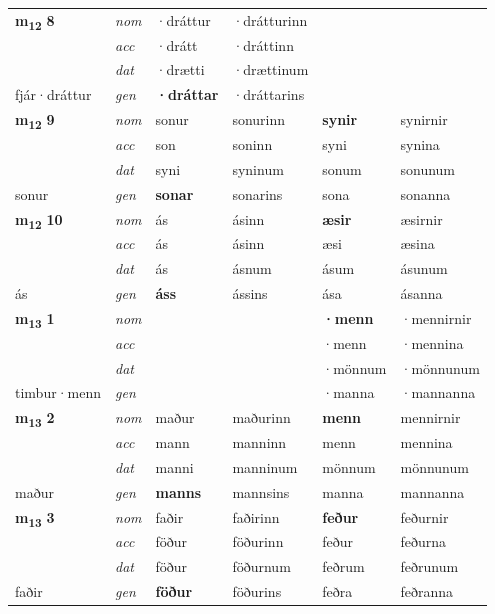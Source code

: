 \begin{longtable}[l]{X>{\footnotesize\itshape}XXXXX}
\multirow{3}{*}{{{\textbf{m{\textsubscript{12}}} \Large{\textbf{8}}}}} & nom & ·dráttur & ·drátturinn & \textbf{} &  \\*
 & acc & ·drátt & ·dráttinn &  &  \\*
 & dat & ·drætti & ·drættinum &  &  \\*
 {\footnotesize{fjár\allowbreak ·dráttur}} & gen & \textbf{·dráttar} & ·dráttarins &  &  \\
\cmidrule{1-6}

\multirow{3}{*}{{{\textbf{m{\textsubscript{12}}} \Large{\textbf{9}}}}} & nom & sonur & sonurinn & \textbf{synir} & synirnir \\*
 & acc & son & soninn & syni & synina \\*
 & dat & syni & syninum & sonum & sonunum \\*
 {\footnotesize{sonur}} & gen & \textbf{sonar} & sonarins & sona & sonanna \\
\cmidrule{1-6}

\multirow{3}{*}{{{\textbf{m{\textsubscript{12}}} \Large{\textbf{10}}}}} & nom & ás & ásinn & \textbf{æsir} & æsirnir \\*
 & acc & ás & ásinn & æsi & æsina \\*
 & dat & ás & ásnum & ásum & ásunum \\*
 {\footnotesize{ás}} & gen & \textbf{áss} & ássins & ása & ásanna \\
\cmidrule{1-6}

\multirow{3}{*}{{{\textbf{m{\textsubscript{13}}} \Large{\textbf{1}}}}} & nom &  &  & \textbf{·menn} & ·mennirnir \\*
 & acc &  &  & ·menn & ·mennina \\*
 & dat &  &  & ·mönnum & ·mönnunum \\*
 {\footnotesize{timbur\allowbreak ·menn}} & gen & \textbf{} &  & ·manna & ·mannanna \\
\cmidrule{1-6}

\multirow{3}{*}{{{\textbf{m{\textsubscript{13}}} \Large{\textbf{2}}}}} & nom & maður & maðurinn & \textbf{menn} & mennirnir \\*
 & acc & mann & manninn & menn & mennina \\*
 & dat & manni & manninum & mönnum & mönnunum \\*
 {\footnotesize{maður}} & gen & \textbf{manns} & mannsins & manna & mannanna \\
\cmidrule{1-6}

\multirow{3}{*}{{{\textbf{m{\textsubscript{13}}} \Large{\textbf{3}}}}} & nom & faðir & faðirinn & \textbf{feður} & feðurnir \\*
 & acc & föður & föðurinn & feður & feðurna \\*
 & dat & föður & föðurnum & feðrum & feðrunum \\*
 {\footnotesize{faðir}} & gen & \textbf{föður} & föðurins & feðra & feðranna \\
\cmidrule{1-6}


\end{longtable}

